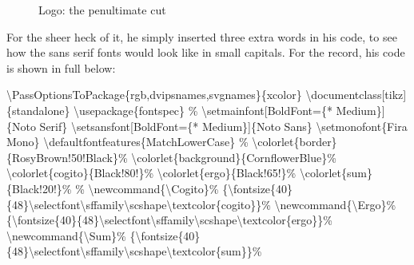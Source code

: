 \documentclass[
  a4paper,
]{article}
\newenvironment{Shaded}{\begin{snugshade}}{\end{snugshade}}
\newcommand{\BuiltInTok}[1]{\textcolor[rgb]{0.80,0.80,0.80}{#1}}
\newcommand{\CommentTok}[1]{\textcolor[rgb]{0.50,0.62,0.50}{#1}}
\newcommand{\ExtensionTok}[1]{\textcolor[rgb]{0.80,0.80,0.80}{#1}}
\newcommand{\FunctionTok}[1]{\textcolor[rgb]{0.94,0.94,0.56}{#1}}
\newcommand{\NormalTok}[1]{\textcolor[rgb]{0.80,0.80,0.80}{#1}}
\begin{document}
\begin{figure}
\centering

\caption{Logo: the penultimate cut}
\end{figure}

For the sheer heck of it, he simply inserted three extra words in his
code, to see how the sans serif fonts would look like in small capitals.
For the record, his code is shown in full below:

\begin{Shaded}
\begin{Highlighting}[]
\FunctionTok{\textbackslash{}PassOptionsToPackage}\NormalTok{\{rgb,dvipsnames,svgnames\}\{xcolor\}}
\BuiltInTok{\textbackslash{}documentclass}\NormalTok{[tikz]\{}\ExtensionTok{standalone}\NormalTok{\}}
\BuiltInTok{\textbackslash{}usepackage}\NormalTok{\{}\ExtensionTok{fontspec}\NormalTok{\}}
\CommentTok{\%}
\FunctionTok{\textbackslash{}setmainfont}\NormalTok{[BoldFont=\{* Medium\}]\{Noto Serif\}}
\FunctionTok{\textbackslash{}setsansfont}\NormalTok{[BoldFont=\{* Medium\}]\{Noto Sans\}}
\FunctionTok{\textbackslash{}setmonofont}\NormalTok{\{Fira Mono\}}
\FunctionTok{\textbackslash{}defaultfontfeatures}\NormalTok{\{MatchLowerCase\}}
\CommentTok{\%}
\FunctionTok{\textbackslash{}colorlet}\NormalTok{\{border\}\{RosyBrown!50!Black\}}\CommentTok{\%}
\FunctionTok{\textbackslash{}colorlet}\NormalTok{\{background\}\{CornflowerBlue\}}\CommentTok{\%}
\FunctionTok{\textbackslash{}colorlet}\NormalTok{\{cogito\}\{Black!80!\}}\CommentTok{\%}
\FunctionTok{\textbackslash{}colorlet}\NormalTok{\{ergo\}\{Black!65!\}}\CommentTok{\%}
\FunctionTok{\textbackslash{}colorlet}\NormalTok{\{sum\}\{Black!20!\}}\CommentTok{\%}
\CommentTok{\%}
\FunctionTok{\textbackslash{}newcommand}\NormalTok{\{}\ExtensionTok{\textbackslash{}Cogito}\NormalTok{\}}\CommentTok{\%}
\NormalTok{\{}\FunctionTok{\textbackslash{}fontsize}\NormalTok{\{40\}\{48\}}\FunctionTok{\textbackslash{}selectfont\textbackslash{}sffamily\textbackslash{}scshape\textbackslash{}textcolor}\NormalTok{\{cogito\}\}}\CommentTok{\%}
\FunctionTok{\textbackslash{}newcommand}\NormalTok{\{}\ExtensionTok{\textbackslash{}Ergo}\NormalTok{\}}\CommentTok{\%}
\NormalTok{\{}\FunctionTok{\textbackslash{}fontsize}\NormalTok{\{40\}\{48\}}\FunctionTok{\textbackslash{}selectfont\textbackslash{}sffamily\textbackslash{}scshape\textbackslash{}textcolor}\NormalTok{\{ergo\}\}}\CommentTok{\%}
\FunctionTok{\textbackslash{}newcommand}\NormalTok{\{}\ExtensionTok{\textbackslash{}Sum}\NormalTok{\}}\CommentTok{\%}
\NormalTok{\{}\FunctionTok{\textbackslash{}fontsize}\NormalTok{\{40\}\{48\}}\FunctionTok{\textbackslash{}selectfont\textbackslash{}sffamily\textbackslash{}scshape\textbackslash{}textcolor}\NormalTok{\{sum\}\}}\CommentTok{\%}

\end{Highlighting}
\end{Shaded}
\end{document}
